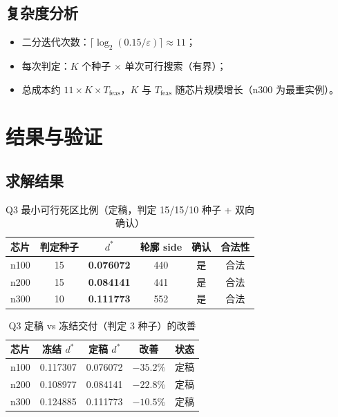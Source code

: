 \documentclass[12pt,a4paper]{article}
\begin{document}
\subsection{复杂度分析}

\begin{itemize}
    \item 二分迭代次数：$\lceil \log_2(0.15/\varepsilon) \rceil \approx 11$；
    \item 每次判定：$K$ 个种子 $\times$ 单次可行搜索（有界）；
    \item 总成本约 $11 \times K \times T_{\text{feas}}$，$K$ 与
    $T_{\text{feas}}$ 随芯片规模增长（n300 为最重实例）。
\end{itemize}

\section{结果与验证}

\subsection{求解结果}

\begin{table}[H]
\centering
\small
\caption{Q3 最小可行死区比例（定稿，判定 15/15/10 种子 + 双向确认）}
\begin{tabular}{lccccc}
\toprule
芯片 & 判定种子 & $d^*$ & 轮廓 side & 确认 & 合法性 \\
\midrule
n100 & 15 & \textbf{0.076072} & 440 & 是 & 合法 \\
n200 & 15 & \textbf{0.084141} & 441 & 是 & 合法 \\
n300 & 10 & \textbf{0.111773} & 552 & 是 & 合法 \\
\bottomrule
\end{tabular}
\end{table}

\begin{table}[H]
\centering
\small
\caption{Q3 定稿 vs 冻结交付（判定 3 种子）的改善}
\begin{tabular}{lcccc}
\toprule
芯片 & 冻结 $d^*$ & 定稿 $d^*$ & 改善 & 状态 \\
\midrule
n100 & 0.117307 & 0.076072 & $-35.2\%$ & 定稿 \\
n200 & 0.108977 & 0.084141 & $-22.8\%$ & 定稿 \\
n300 & 0.124885 & 0.111773 & $-10.5\%$ & 定稿 \\
\bottomrule
\end{tabular}
\end{table}
\end{document}
